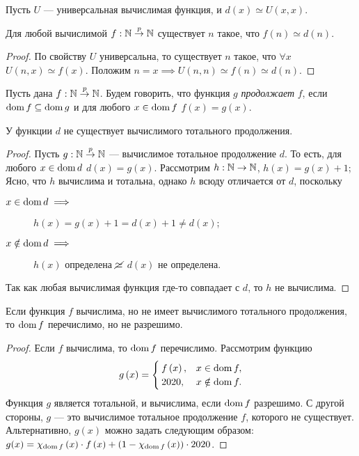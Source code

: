Пусть $U$ --- универсальная вычислимая функция, и $d\left(x\right) \simeq U\left(x, x\right)$.
\begin{statement} \label{st::02::03::01}
    Для любой вычислимой $f: \mathbb{N} \overset{p}{\to} \mathbb{N}$ существует $n$ такое, что $f\left(n\right) \simeq d(n)$.
\end{statement}
\begin{proof}
    По свойству $U$ универсальна, то существует $n$ такое, что $\forall x$ $U\left(n, x\right) \simeq f\left(x\right)$.
    Положим $n = x \implies U\left(n, n\right) \simeq f\left(n\right) \simeq d\left(n\right)$.
\end{proof}
\begin{definition}
    Пусть дана $f: \mathbb{N} \overset{p}{\to} \mathbb{N}$.
    Будем говорить, что функция $g$ {\it продолжает} $f$, если $\operatorname{dom} f \subseteq \operatorname{dom} g$ и для любого $x \in \operatorname{dom} f$ $f(x) = g(x)$.
\end{definition}
\begin{statement}
    У функции $d$ не существует вычислимого тотального продолжения.
\end{statement}
\begin{proof}
    Пусть $g: \mathbb{N} \overset{p}{\to} \mathbb{N}$ --- вычислимое тотальное продолжение $d$.
    То есть, для любого $x \in \operatorname{dom} d$ $d\left(x\right) = g\left(x\right)$.
    Рассмотрим $h: \mathbb{N} \to \mathbb{N}$, $h(x) = g(x) + 1$;
    Ясно, что $h$ вычислима и тотальна, однако $h$ всюду отличается от $d$, поскольку
    \begin{description}
        \item[$x \in \operatorname{dom} d \implies$] $h(x) = g(x) + 1 = d(x) + 1 \neq d(x)$;
        \item[$x \notin \operatorname{dom} d \implies$] $h(x)$ определена $\cancel{\simeq}$ $d(x)$ не определена.
    \end{description}
    Так как любая вычислимая функция где-то совпадает с $d$, то $h$ не вычислима.
\end{proof}
\begin{statement}
    Если функция $f$ вычислима, но не имеет вычислимого тотального продолжения, то $\operatorname{dom} f$ перечислимо, но не разрешимо.
\end{statement}
\begin{proof}
    Если $f$ вычислима, то $\operatorname{dom} f$ перечислимо.
    Рассмотрим функцию
    $$
        g\left(x\right) = \begin{cases}
            f\left(x\right), & x \in \operatorname{dom} f, \\
            2020, & x \notin \operatorname{dom} f.
        \end{cases}
    $$
    Функция $g$ является тотальной, и вычислима, если $\operatorname{dom} f$ разрешимо.
    С другой стороны, $g$ --- это вычислимое тотальное продолжение $f$, которого не существует.
    Альтернативно, $g\left(x\right)$ можно задать следующим образом: $g(x) = \chi_{\operatorname{dom} f}\left(x\right) \cdot f\left(x\right) + \left(1 - \chi_{\operatorname{dom} f}\left(x\right)\right) \cdot 2020$.
\end{proof}
